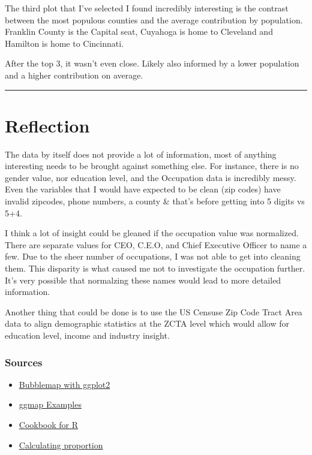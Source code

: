 \documentclass[]{article}
\providecommand{\tightlist}{%
  \setlength{\itemsep}{0pt}\setlength{\parskip}{0pt}}
\begin{document}
The third plot that I've selected I found incredibly interesting is the
contrast between the most populous counties and the average contribution
by population. Franklin County is the Capital seat, Cuyahoga is home to
Cleveland and Hamilton is home to Cincinnati.

After the top 3, it wasn't even close. Likely also informed by a lower
population and a higher contribution on average.

\begin{center}\rule{0.5\linewidth}{\linethickness}\end{center}

\hypertarget{reflection}{%
\section{Reflection}\label{reflection}}

The data by itself does not provide a lot of information, most of
anything interesting needs to be brought against something else. For
instance, there is no gender value, nor education level, and the
Occupation data is incredibly messy. Even the variables that I would
have expected to be clean (zip codes) have invalid zipcodes, phone
numbers, a county \& that's before getting into 5 digits vs 5+4.

I think a lot of insight could be gleaned if the occupation value was
normalized. There are separate values for CEO, C.E.O, and Chief
Executive Officer to name a few. Due to the sheer number of occupations,
I was not able to get into cleaning them. This disparity is what caused
me not to investigate the occupation further. It's very possible that
normalzing these names would lead to more detailed information.

Another thing that could be done is to use the US Censuse Zip Code Tract
Area data to align demographic statistics at the ZCTA level which would
allow for education level, income and industry insight.

\hypertarget{sources}{%
\subsubsection{Sources}\label{sources}}

\begin{itemize}
\tightlist
\item
  \href{https://www.r-graph-gallery.com/330-bubble-map-with-ggplot2.html}{Bubblemap
  with ggplot2}
\item
  \href{https://rpubs.com/jiayiliu/ggmap_examples}{ggmap Examples}
\item
  \href{http://www.cookbook-r.com/}{Cookbook for R}
\item
  \href{https://community.rstudio.com/t/how-do-i-calculate-ratios-with-categorical-variables-in-a-summary/1917/16}{Calculating
  proportion}
\end{itemize}
\end{document}
